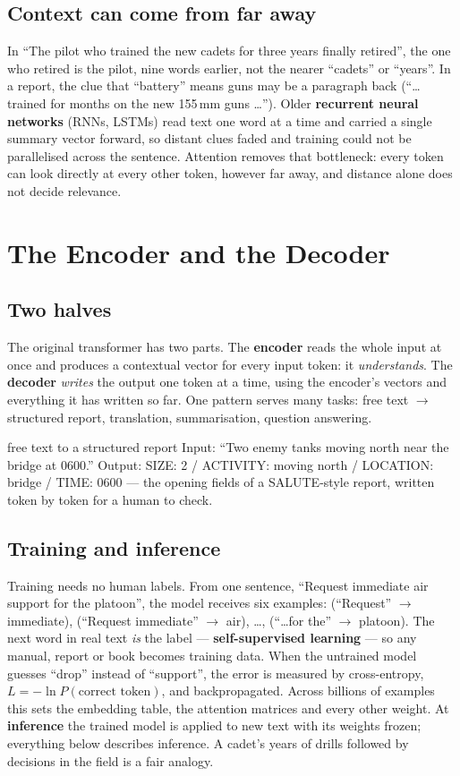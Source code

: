 \documentclass[11pt]{article}
\begin{document}
\subsection{Context can come from far away}
In ``The pilot who trained the new cadets for three years finally retired'', the one who retired is the pilot, nine words earlier, not the nearer ``cadets'' or ``years''. In a report, the clue that ``battery'' means guns may be a paragraph back (``\dots trained for months on the new 155\,mm guns \dots''). Older \textbf{recurrent neural networks} (RNNs, LSTMs) read text one word at a time and carried a single summary vector forward, so distant clues faded and training could not be parallelised across the sentence. Attention removes that bottleneck: every token can look directly at every other token, however far away, and distance alone does not decide relevance.

\section{The Encoder and the Decoder}
\subsection{Two halves}
The original transformer has two parts. The \textbf{encoder} reads the whole input at once and produces a contextual vector for every input token: it \emph{understands}. The \textbf{decoder} \emph{writes} the output one token at a time, using the encoder's vectors and everything it has written so far. One pattern serves many tasks: free text $\to$ structured report, translation, summarisation, question answering.
\begin{example}{free text to a structured report}
Input: ``Two enemy tanks moving north near the bridge at 0600.'' Output: SIZE: 2 / ACTIVITY: moving north / LOCATION: bridge / TIME: 0600 --- the opening fields of a SALUTE-style report, written token by token for a human to check.
\end{example}

\subsection{Training and inference}
Training needs no human labels. From one sentence, ``Request immediate air support for the platoon'', the model receives six examples: (``Request'' $\to$ immediate), (``Request immediate'' $\to$ air), \dots, (``\dots for the'' $\to$ platoon). The next word in real text \emph{is} the label --- \textbf{self-supervised learning} --- so any manual, report or book becomes training data. When the untrained model guesses ``drop'' instead of ``support'', the error is measured by cross-entropy, $L=-\ln P(\text{correct token})$, and backpropagated. Across billions of examples this sets the embedding table, the attention matrices and every other weight. At \textbf{inference} the trained model is applied to new text with its weights frozen; everything below describes inference. A cadet's years of drills followed by decisions in the field is a fair analogy.
\end{document}
